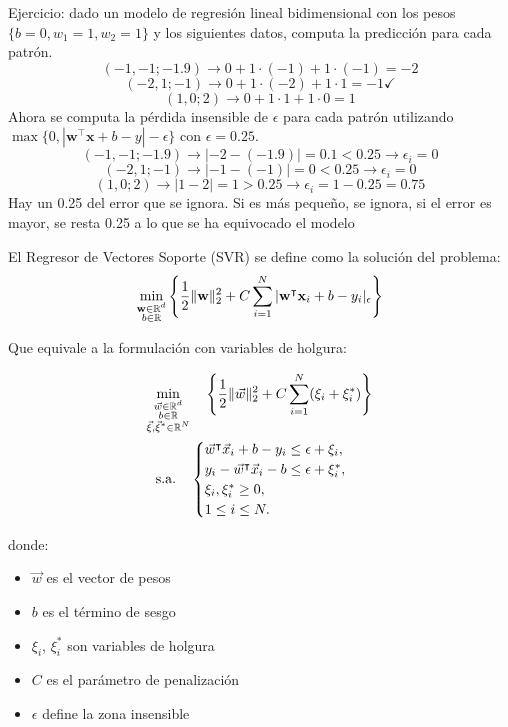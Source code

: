 Ejercicio: dado un modelo de regresión lineal bidimensional con los pesos $\{b = 0, w_1 = 1, w_2 = 1\}$ y los siguientes datos, computa la predicción para cada patrón.
$$(-1, -1; -1.9) \rightarrow 0 + 1 \cdot (-1) + 1 \cdot (-1) = -2$$
$$(-2, 1; -1) \rightarrow 0 + 1 \cdot (-2) + 1 \cdot 1 = -1 \checkmark$$
$$(1, 0; 2) \rightarrow 0 + 1 \cdot 1 + 1 \cdot 0 = 1$$
Ahora se computa la pérdida insensible de $\epsilon$ para cada patrón utilizando $\max\bigl\{0, |\mathbf{w}^\intercal \mathbf{x} + b - y| - \epsilon\bigr\}$ con $\epsilon = 0.25$.
$$(-1, -1; -1.9) \rightarrow |-2 -(-1.9)| = 0.1 < 0.25 \rightarrow \epsilon_i = 0$$
$$(-2, 1; -1) \rightarrow |-1 - (-1)| = 0 < 0.25 \rightarrow \epsilon_i = 0 $$
$$(1, 0; 2) \rightarrow |1 - 2| = 1 > 0.25 \rightarrow \epsilon_i = 1 - 0.25 = 0.75$$
Hay un 0.25 del error que se ignora. Si es más pequeño, se ignora, si el error es mayor, se resta 0.25 a lo que se ha equivocado el modelo 

El Regresor de Vectores Soporte (SVR) se define como la solución del problema:
$$\min_{\begin{subarray}{c}
    \mathbf{w} \in \mathbb{R}^d \\
    b \in \mathbb{R}
\end{subarray}}
\left\{
    \frac{1}{2} \|\mathbf{w}\|_2^2 + C \sum_{i=1}^{N} |\mathbf{w}^{\intercal} \mathbf{x}_i + b - y_i|_\epsilon
\right\}$$

Que equivale a la formulación con variables de holgura:

\begin{align*}
\min_{\begin{subarray}{c}
    \vec{w} \in \mathbb{R}^d \\
    b \in \mathbb{R} \\
    \vec{\xi}, \vec{\xi}^* \in \mathbb{R}^N
\end{subarray}}
&\quad \left\{
    \frac{1}{2} \|\vec{w}\|_2^2 + C \sum_{i=1}^{N} (\xi_i + \xi_i^*)
\right\} \\
\text{s.a.} \quad &
\begin{cases}
    \vec{w}^{\intercal} \vec{x}_i + b - y_i \leq \epsilon + \xi_i, \\
    y_i - \vec{w}^{\intercal} \vec{x}_i - b \leq \epsilon + \xi_i^*, \\
    \xi_i, \xi_i^* \geq 0, \\
    1 \leq i \leq N.
\end{cases}
\end{align*}

donde:
\begin{itemize}
    \item $\vec{w}$ es el vector de pesos
    \item $b$ es el término de sesgo
    \item $\xi_i$, $\xi_i^*$ son variables de holgura
    \item $C$ es el parámetro de penalización
    \item $\epsilon$ define la zona insensible
\end{itemize}

